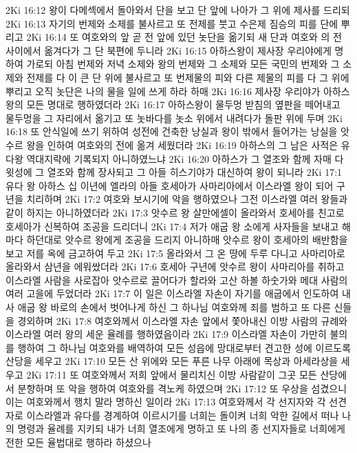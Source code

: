 2Ki 16:12  왕이 다메섹에서 돌아와서 단을 보고 단 앞에 나아가 그 위에 제사를 드리되
2Ki 16:13  자기의 번제와 소제를 불사르고 또 전제를 붓고 수은제 짐승의 피를 단에 뿌리고
2Ki 16:14  또 여호와의 앞 곧 전 앞에 있던 놋단을 옮기되 새 단과 여호와 의 전 사이에서 옮겨다가 그 단 북편에 두니라
2Ki 16:15  아하스왕이 제사장 우리야에게 명하여 가로되 아침 번제와 저녁 소제와 왕의 번제와 그 소제와 모든 국민의 번제와 그 소제와 전제를 다 이 큰 단 위에 불사르고 또 번제물의 피와 다른 제물의 피를 다 그 위에 뿌리고 오직 놋단은 나의 물을 일에 쓰게 하라 하매
2Ki 16:16  제사장 우리야가 아하스왕의 모든 명대로 행하였더라
2Ki 16:17  아하스왕이 물두멍 받침의 옆판을 떼어내고 물두멍을 그 자리에서 옮기고 또 놋바다를 놋소 위에서 내려다가 돌판 위에 두며
2Ki 16:18  또 안식일에 쓰기 위하여 성전에 건축한 낭실과 왕이 밖에서 들어가는 낭실을 앗수르 왕을 인하여 여호와의 전에 옮겨 세웠더라
2Ki 16:19  아하스의 그 남은 사적은 유다왕 역대지략에 기록되지 아니하였느냐
2Ki 16:20  아하스가 그 열조와 함께 자매 다윗성에 그 열조와 함께 장사되고 그 아들 히스기야가 대신하여 왕이 되니라
2Ki 17:1  유다 왕 아하스 십 이년에 엘라의 아들 호세아가 사마리아에서 이스라엘 왕이 되어 구년을 치리하며
2Ki 17:2  여호와 보시기에 악을 행하였으나 그전 이스라엘 여러 왕들과 같이 하지는 아니하였더라
2Ki 17:3  앗수르 왕 살만에셀이 올라와서 호세아를 친고로 호세아가 신복하여 조공을 드리더니
2Ki 17:4  저가 애굽 왕 소에게 사자들을 보내고 해마다 하던대로 앗수르 왕에게 조공을 드리지 아니하매 앗수르 왕이 호세아의 배반함을 보고 저를 옥에 금고하여 두고
2Ki 17:5  올라와서 그 온 땅에 두루 다니고 사마리아로 올라와서 삼년을 에워쌌더라
2Ki 17:6  호세아 구년에 앗수르 왕이 사마리아를 취하고 이스라엘 사람을 사로잡아 앗수르로 끌어다가 할라와 고산 하볼 하숫가와 메대 사람의 여러 고을에 두었더라
2Ki 17:7  이 일은 이스라엘 자손이 자기를 애굽에서 인도하여 내사 애굽 왕 바로의 손에서 벗어나게 하신 그 하나님 여호와께 죄를 범하고 또 다른 신들을 경외하며
2Ki 17:8  여호와께서 이스라엘 자손 앞에서 쫓아내신 이방 사람의 규례와 이스라엘 여러 왕의 세운 율례를 행하였음이라
2Ki 17:9  이스라엘 자손이 가만히 불의를 행하여 그 하나님 여호와를 배역하여 모든 성읍에 망대로부터 견고한 성에 이르도록 산당을 세우고
2Ki 17:10  모든 산 위에와 모든 푸른 나무 아래에 목상과 아세라상을 세우고
2Ki 17:11  또 여호와께서 저희 앞에서 물리치신 이방 사람같이 그곳 모든 산당에서 분향하며 또 악을 행하여 여호와를 격노케 하였으며
2Ki 17:12  또 우상을 섬겼으니 이는 여호와께서 행치 말라 명하신 일이라
2Ki 17:13  여호와께서 각 선지자와 각 선견자로 이스라엘과 유다를 경계하여 이르시기를 너희는 돌이켜 너희 악한 길에서 떠나 나의 명령과 율례를 지키되 내가 너희 열조에게 명하고 또 나의 종 선지자들로 너희에게 전한 모든 율법대로 행하라 하셨으나
